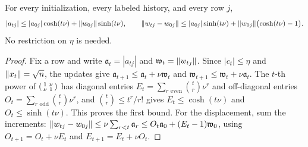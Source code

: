 \documentclass[11pt,letterpaper,pmlr,twoside]{jmlr}
\begin{document}
\begin{lemma}
\label{lem:rows}
For every initialization, every labeled history, and every row $j$,
\[
 |a_{tj}|\le|a_{0j}|\cosh(t\nu)+\lVert w_{0j}\rVert\sinh(t\nu),\qquad
 \lVert w_{tj}-w_{0j}\rVert\le|a_{0j}|\sinh(t\nu)+\lVert w_{0j}\rVert\bigl(\cosh(t\nu)-1\bigr).
\]
No restriction on $\eta$ is needed.
\end{lemma}
\begin{proof}
Fix a row and write $\mathfrak a_t=|a_{tj}|$ and $\mathfrak w_t=\lVert w_{tj}\rVert$. Since $|c_t|\le\eta$ and $\lVert x_t\rVert=\sqrt n$, the updates give $\mathfrak a_{t+1}\le \mathfrak a_t+\nu \mathfrak w_t$ and $\mathfrak w_{t+1}\le \mathfrak w_t+\nu \mathfrak a_t$. The $t$-th power of $\begin{psmallmatrix}1&\nu\\\nu&1\end{psmallmatrix}$ has diagonal entries $E_t=\sum_{r\text{ even}}\binom tr\nu^r$ and off-diagonal entries $O_t=\sum_{r\text{ odd}}\binom tr\nu^r$, and $\binom tr\le t^r/r!$ gives $E_t\le\cosh(t\nu)$ and $O_t\le\sinh(t\nu)$. This proves the first bound. For the displacement, sum the increments: $\lVert w_{tj}-w_{0j}\rVert\le\nu\sum_{r<t}\mathfrak a_r\le O_t\mathfrak a_0+(E_t-1)\mathfrak w_0$, using $O_{t+1}=O_t+\nu E_t$ and $E_{t+1}=E_t+\nu O_t$.
\end{proof}
\end{document}
